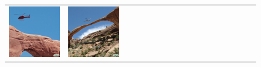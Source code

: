 \begin{figure}[ht!]
\begin{adjustwidth}{-0.8in}{-0.5in}
\begin{tabular}{cccccccccccccccccccc}
\multicolumn{2}{c}{\includegraphics[width=\threebythreecolwidth\textwidth]{figures/cherries/arches1.jpg}} &
\multicolumn{2}{c}{\includegraphics[width=\threebythreecolwidth\textwidth]{figures/cherries/arches2.jpg}} &

\end{tabular}
\end{adjustwidth}
\end{figure}
